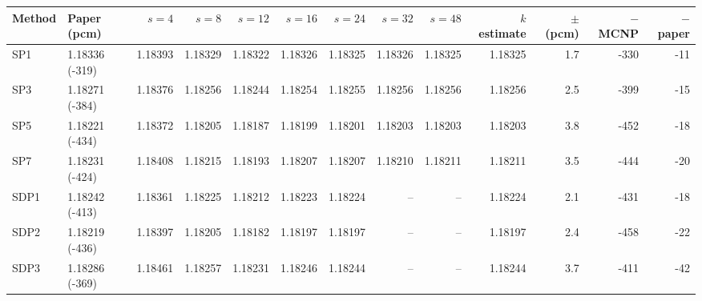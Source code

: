 \begin{tabular}{llrrrrrrrrrrr}
\hline
Method & Paper (pcm) & $s=4$ & $s=8$ & $s=12$ & $s=16$ & $s=24$ & $s=32$ & $s=48$ & $k$ estimate & $\pm$ (pcm) & $-$ MCNP & $-$ paper \\
\hline
SP1 & 1.18336 (-319) & 1.18393 & 1.18329 & 1.18322 & 1.18326 & 1.18325 & 1.18326 & 1.18325 & 1.18325 & 1.7 & -330 & -11 \\
SP3 & 1.18271 (-384) & 1.18376 & 1.18256 & 1.18244 & 1.18254 & 1.18255 & 1.18256 & 1.18256 & 1.18256 & 2.5 & -399 & -15 \\
SP5 & 1.18221 (-434) & 1.18372 & 1.18205 & 1.18187 & 1.18199 & 1.18201 & 1.18203 & 1.18203 & 1.18203 & 3.8 & -452 & -18 \\
SP7 & 1.18231 (-424) & 1.18408 & 1.18215 & 1.18193 & 1.18207 & 1.18207 & 1.18210 & 1.18211 & 1.18211 & 3.5 & -444 & -20 \\
SDP1 & 1.18242 (-413) & 1.18361 & 1.18225 & 1.18212 & 1.18223 & 1.18224 & -- & -- & 1.18224 & 2.1 & -431 & -18 \\
SDP2 & 1.18219 (-436) & 1.18397 & 1.18205 & 1.18182 & 1.18197 & 1.18197 & -- & -- & 1.18197 & 2.4 & -458 & -22 \\
SDP3 & 1.18286 (-369) & 1.18461 & 1.18257 & 1.18231 & 1.18246 & 1.18244 & -- & -- & 1.18244 & 3.7 & -411 & -42 \\
\hline
\end{tabular}
